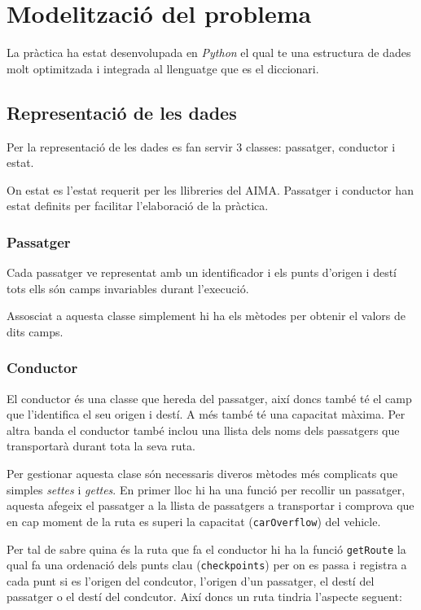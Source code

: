\section{Modelització del problema}
La pràctica ha estat desenvolupada en \emph{Python} el qual te una estructura de dades molt optimitzada
i integrada al llenguatge que es el diccionari.

\subsection{Representació de les dades}
Per la representació de les dades es fan servir 3 classes: passatger, conductor i estat.

On estat es l'estat requerit per les llibreries del AIMA. Passatger i conductor han estat
definits per facilitar l'elaboració de la pràctica.

\subsubsection{Passatger}
Cada passatger ve representat amb un identificador i els punts d'origen i destí tots ells són
camps invariables durant l'execució.

Assosciat a aquesta classe simplement hi ha els mètodes per obtenir el valors de dits camps.

\subsubsection{Conductor}
El conductor és una classe que hereda del passatger, així doncs també té el camp que l'identifica
el seu origen i destí. A més també té una capacitat màxima.
Per altra banda el conductor també inclou una llista dels noms dels passatgers que transportarà
durant tota la seva ruta.

Per gestionar aquesta clase són necessaris diveros mètodes més complicats que simples \emph{settes} i \emph{gettes}.
En primer lloc hi ha una funció  per recollir un passatger, aquesta afegeix el passatger
a la llista de passatgers a transportar i comprova que en cap moment de la ruta es superi la capacitat
(\texttt{carOverflow}) del vehicle.

Per tal de sabre quina és la ruta que fa el conductor hi ha la funció \texttt{getRoute} la qual
fa una ordenació dels punts clau (\texttt{checkpoints}) per on es passa i registra a cada punt si es
l'origen del condcutor, l'origen d'un passatger, el destí del passatger o el destí del condcutor. Així
doncs un ruta tindria l'aspecte seguent: 


